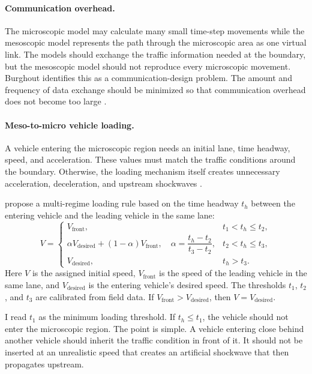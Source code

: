 \begin{bibunit}[plainnat]
\paragraph*{Communication overhead.}
The microscopic model may calculate many small time-step movements while the
mesoscopic model represents the path through the microscopic area as one
virtual link. The models should exchange the traffic information needed at the
boundary, but the mesoscopic model should not reproduce every microscopic
movement. Burghout identifies this as a communication-design problem. The
amount and frequency of data exchange should be minimized so that communication
overhead does not become too large \citep{burghout2005hybrid}.

\paragraph*{Meso-to-micro vehicle loading.}
A vehicle entering the microscopic region needs an initial lane, time headway,
speed, and acceleration. These values must match the traffic conditions around
the boundary. Otherwise, the loading mechanism itself creates unnecessary
acceleration, deceleration, and upstream shockwaves
\citep{burghout2006loading}.

\citet{burghout2006loading} propose a multi-regime loading rule based on the
time headway $t_h$ between the entering vehicle and the leading vehicle in the
same lane:
\[
V =
\begin{cases}
V_{\mathrm{front}},
& t_1 < t_h \leq t_2, \\[4pt]

\alpha V_{\mathrm{desired}}+(1-\alpha)V_{\mathrm{front}},
\quad
\alpha=\dfrac{t_h-t_2}{t_3-t_2},
& t_2 < t_h \leq t_3, \\[8pt]

V_{\mathrm{desired}},
& t_h > t_3.
\end{cases}
\]
Here $V$ is the assigned initial speed, $V_{\mathrm{front}}$ is the speed of
the leading vehicle in the same lane, and $V_{\mathrm{desired}}$ is the
entering vehicle's desired speed. The thresholds $t_1$, $t_2$, and $t_3$ are
calibrated from field data. If $V_{\mathrm{front}}>V_{\mathrm{desired}}$, then
$V=V_{\mathrm{desired}}$.

I read $t_1$ as the minimum loading threshold. If $t_h \leq t_1$, the vehicle
should not enter the microscopic region. The point is simple. A vehicle
entering close behind another vehicle should inherit the traffic condition in
front of it. It should not be inserted at an unrealistic speed that creates an
artificial shockwave that then propagates upstream.


\end{bibunit}
